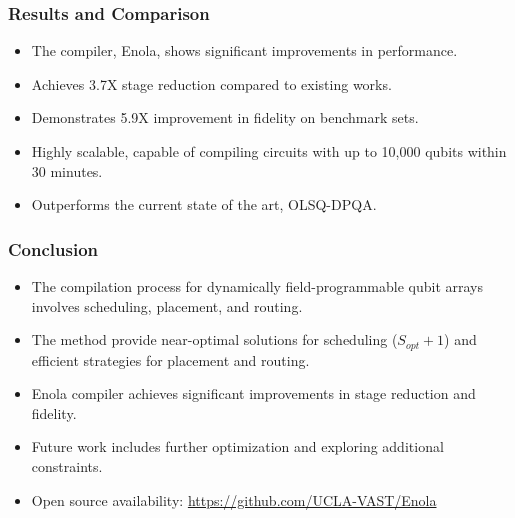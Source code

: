 \documentclass[18 pt]{beamer}
\begin{document}
\begin{frame}
    \frametitle{Results and Comparison}
    \begin{itemize}
        \item The compiler, Enola, shows significant improvements in performance.
        \item Achieves 3.7X stage reduction compared to existing works.
        \item Demonstrates 5.9X improvement in fidelity on benchmark sets.
        \item Highly scalable, capable of compiling circuits with up to 10,000 qubits within 30 minutes.
        \item Outperforms the current state of the art, OLSQ-DPQA.
    \end{itemize}
\end{frame}

\begin{frame}
    \frametitle{Conclusion}
    \begin{itemize}
        \item The compilation process for dynamically field-programmable qubit arrays involves scheduling, placement, and routing.
        \item The method provide near-optimal solutions for scheduling ($S_{opt} +1$) and efficient strategies for placement and routing.
        \item Enola compiler achieves significant improvements in stage reduction and fidelity.
        \item Future work includes further optimization and exploring additional constraints.
        \item Open source availability: \url{https://github.com/UCLA-VAST/Enola}
    \end{itemize}
\end{frame}
\end{document}
